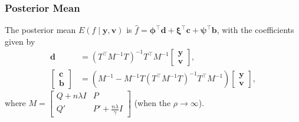 \documentclass{beamer}
\begin{document}
\begin{frame}
\frametitle{Posterior Mean}


The posterior mean $E(f \mid \mathbf{y},\mathbf{v})$ is $\hat{f}  = \mathbf{\phi}^\top \mathbf{d}+\mathbf{\xi}^\top \mathbf{c}+\mathbf{\psi}^\top \mathbf{b}$, with the coefficients given by
\begin{align} 
\mathbf{d}&=\left(T^\top M^{-1}T\right)^{-1}T^\top M^{-1}\begin{bmatrix}\mathbf{y} \\ \mathbf{v} \end{bmatrix},\\
\begin{bmatrix}\mathbf{c}\\ \mathbf{b}\end{bmatrix} &=
\left(M^{-1}-M^{-1}T\left(T^\top M^{-1} T\right)^{-1}T^\top M^{-1}\right)\begin{bmatrix}\mathbf{y}\\ \mathbf{v} \end{bmatrix},
\end{align} 
where $M=\begin{bmatrix} Q+n\lambda I& P\\ Q'& P'+\frac{n\lambda}{\gamma}I \end{bmatrix}$ (when the $\rho\rightarrow \infty$).


\end{frame}



\end{document}
